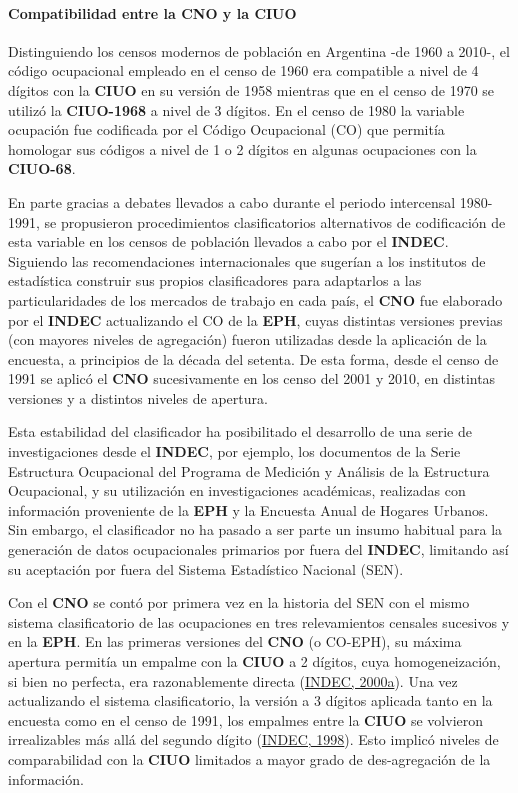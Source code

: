 \documentclass[
]{article}
\begin{document}
\hypertarget{compatibilidad-entre-la-cno-y-la-ciuo}{%
\paragraph{Compatibilidad entre la CNO y la CIUO}\label{compatibilidad-entre-la-cno-y-la-ciuo}}

Distinguiendo los censos modernos de población en Argentina -de 1960 a 2010-, el código ocupacional empleado en el censo de 1960 era compatible a nivel de 4 dígitos con la \textbf{CIUO} en su versión de 1958 mientras que en el censo de 1970 se utilizó la \textbf{CIUO-1968} a nivel de 3 dígitos. En el censo de 1980 la variable ocupación fue codificada por el Código Ocupacional (CO) que permitía homologar sus códigos a nivel de 1 o 2 dígitos en algunas ocupaciones con la \textbf{CIUO-68}.

En parte gracias a debates llevados a cabo durante el periodo intercensal 1980-1991, se propusieron procedimientos clasificatorios alternativos de codificación de esta variable en los censos de población llevados a cabo por el \textbf{INDEC}. Siguiendo las recomendaciones internacionales que sugerían a los institutos de estadística construir sus propios clasificadores para adaptarlos a las particularidades de los mercados de trabajo en cada país, el \textbf{CNO} fue elaborado por el \textbf{INDEC} actualizando el CO de la \textbf{EPH}, cuyas distintas versiones previas (con mayores niveles de agregación) fueron utilizadas desde la aplicación de la encuesta, a principios de la década del setenta. De esta forma, desde el censo de 1991 se aplicó el \textbf{CNO} sucesivamente en los censo del 2001 y 2010, en distintas versiones y a distintos niveles de apertura.

Esta estabilidad del clasificador ha posibilitado el desarrollo de una serie de investigaciones desde el \textbf{INDEC}, por ejemplo, los documentos de la Serie Estructura Ocupacional del Programa de Medición y Análisis de la Estructura Ocupacional, y su utilización en investigaciones académicas, realizadas con información proveniente de la \textbf{EPH} y la Encuesta Anual de Hogares Urbanos. Sin embargo, el clasificador no ha pasado a ser parte un insumo habitual para la generación de datos ocupacionales primarios por fuera del \textbf{INDEC}, limitando así su aceptación por fuera del Sistema Estadístico Nacional (SEN).

Con el \textbf{CNO} se contó por primera vez en la historia del SEN con el mismo sistema clasificatorio de las ocupaciones en tres relevamientos censales sucesivos y en la \textbf{EPH}. En las primeras versiones del \textbf{CNO} (o CO-EPH), su máxima apertura permitía un empalme con la \textbf{CIUO} a 2 dígitos, cuya homogeneización, si bien no perfecta, era razonablemente directa (\protect\hyperlink{ref-INDEC2000}{INDEC, 2000a}). Una vez actualizando el sistema clasificatorio, la versión a 3 dígitos aplicada tanto en la encuesta como en el censo de 1991, los empalmes entre la \textbf{CIUO} se volvieron irrealizables más allá del segundo dígito (\protect\hyperlink{ref-INDEC1998}{INDEC, 1998}). Esto implicó niveles de comparabilidad con la \textbf{CIUO} limitados a mayor grado de des-agregación de la información.
\end{document}
